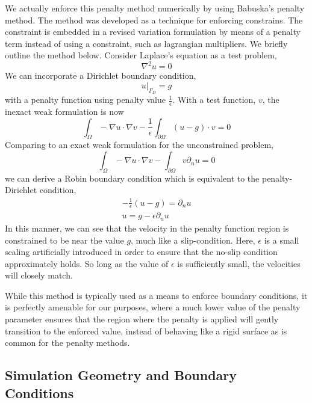 We actually enforce this penalty method numerically by using Babuska's
penalty method\cite{1973fempen,ZAMM:ZAMM19880680925}.
The method was developed as a technique for enforcing constrains. 
The constraint is embedded in a revised variation formulation by means
of a penalty term instead of using a constraint, such as lagrangian
multipliers. We briefly outline the method below.  
Consider Laplace's equation as a test problem, 
\begin{equation}
 \nabla^2 u = 0 
\end{equation}
We can incorporate a Dirichlet boundary condition, 
\begin{equation}
 u|_{\Gamma_D} = g
\end{equation}
with a penalty function using penalty value $\frac{1}{\epsilon}$.
With a test function, $v$, the inexact weak formulation is now
\begin{equation}
\int_{\Omega}  - \nabla u \cdot \nabla v - \frac{1}{\epsilon}
 \int_{\partial \Omega} (u-g) \cdot v = 0 
\end{equation}
Comparing to an exact weak formulation for the unconstrained problem, 
\begin{equation}
\int_{\Omega}  - \nabla u \cdot \nabla v - 
 \int_{\partial \Omega} v \partial_n u = 0 
\end{equation}
we can derive a Robin boundary condition which is equivalent to the
penalty-Dirichlet condition,
\begin{align}
-\frac{1}{\epsilon}(u-g) = \partial_n u \\
 u = g - \epsilon \partial_n u 
\end{align}
In this manner, we can see that the velocity in the penalty function
region is constrained to be near the value $g$, much like a
slip-condition. Here, $\epsilon$ is a small
scaling artificially introduced in order to ensure that the no-slip
condition approximately holds. So long as the value of $\epsilon$ is
sufficiently small, the velocities will closely match. 

While this method is typically used as a means to enforce boundary
conditions, it is perfectly amenable for our purposes, where a much lower
value of the penalty parameter ensures that the region where the penalty
is applied will gently transition to the enforced value, instead of
behaving like a rigid surface as is common for the penalty methods.

\subsection{Simulation Geometry and Boundary Conditions}
\label{sec:bc}

